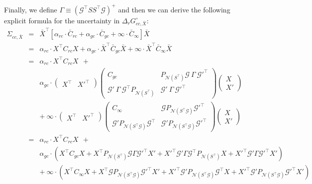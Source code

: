 \documentclass[11pt]{article}
\newcommand{\Gmat}{\mathcal{G}}
\newcommand{\PNmat}[1]{P_{\mathcal{N}\left(#1\right)}}
\begin{document}
Finally, we define $\Gamma \equiv \left(\Gmat^{\top}SS^{\top}\Gmat\right)^{+}$ and then we can derive the following explicit formula for the uncertainty in $\Delta_{r}G_{cc,\bar{X}}^{\circ}$:
\begin{eqnarray}
\Sigma_{cc,\bar{X}}
&=& 
\bar{X}^{\top} \left[ \alpha_{rc}\cdot \bar{C}_{rc} + \alpha_{gc}\cdot \bar{C}_{gc} + \infty\cdot \bar{C}_{\infty}  \right] \bar{X}
\\ &=&
\alpha_{rc} \cdot X^{\top} C_{rc} X + \alpha_{gc} \cdot \bar{X}^{\top} \bar{C}_{gc} \bar{X} + \infty \cdot \bar{X}^{\top} \bar{C}_{\infty} \bar{X}
\nonumber\\ &=&
\alpha_{rc} \cdot X^{\top} C_{rc} X ~~+
\nonumber\\ &&
\alpha_{gc} \cdot \left( \begin{array}{c|c} X^\top & X'^\top \end{array} \right)
\left( \begin{array}{c|c}
		C_{gc} &
		\PNmat{S^\top} \Gmat ~ \Gamma ~ \Gmat'^\top \\ \hline
		\Gmat' ~ \Gamma ~ \Gmat^\top \PNmat{S^\top} &
		\Gmat' ~ \Gamma ~ \Gmat'^\top
	\end{array} \right)
 \left( \begin{array}{c} X \\ \hline X' \end{array} \right)
\nonumber\\ &&+~
\infty \cdot \left( \begin{array}{c|c} X^\top & X'^\top \end{array} \right)
\left( \begin{array}{c|c}
		C_\infty &
		\Gmat \PNmat{S^\top\Gmat} \Gmat'^\top \\ \hline
		\Gmat' \PNmat{S^\top\Gmat} \Gmat^\top &
		\Gmat' \PNmat{S^\top\Gmat} \Gmat'^\top
 \end{array}\right) \left( \begin{array}{c} X \\ \hline X' \end{array} \right)
\nonumber\\ &=&
\alpha_{rc} \cdot X^{\top} C_{rc} X ~~+
\nonumber\\ &&
\alpha_{gc} \cdot \left(
	X^\top C_{gc} X +
	X^\top \PNmat{S^\top} \Gmat  \Gamma \Gmat'^\top                X' + 
	X'^\top               \Gmat' \Gamma \Gmat^\top  \PNmat{S^\top} X  +
	X'^\top               \Gmat' \Gamma \Gmat'^\top                X'
\right)
\nonumber\\ &&+~
\infty \cdot \left(
	X^\top C_{\infty} X +
	X^\top \Gmat \PNmat{S^\top\Gmat} \Gmat'^\top X' +
	X'^\top \Gmat' \PNmat{S^\top\Gmat} \Gmat^\top X +
	X'^\top \Gmat' \PNmat{S^\top\Gmat} \Gmat'^\top X'
\right)
\nonumber
\label{eq:standard_error}
\end{eqnarray}
\end{document}
